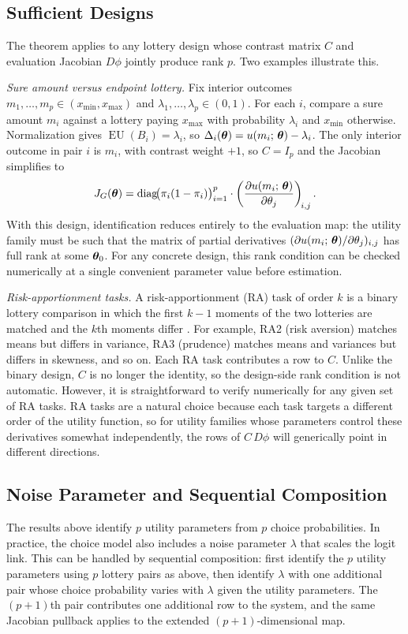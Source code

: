 \subsection{Sufficient Designs}

The theorem applies to any lottery design whose contrast matrix $C$
and evaluation Jacobian $D\phi$ jointly produce rank $p$. Two examples
illustrate this.

\textit{Sure amount versus endpoint lottery.} Fix interior outcomes
$m_1,\ldots,m_p \in (x_{\min},x_{\max})$ and
$\lambda_1,\ldots,\lambda_p \in (0,1)$. For each $i$, compare a sure
amount $m_i$ against a lottery paying $x_{\max}$ with probability
$\lambda_i$ and $x_{\min}$ otherwise. Normalization gives
$\operatorname{EU}(B_i) = \lambda_i$, so
$\Delta_i(\boldsymbol{\theta}) =
 u(m_i;\,\boldsymbol{\theta}) - \lambda_i$.
The only interior outcome in pair $i$ is $m_i$, with contrast weight
$+1$, so $C = I_p$ and the Jacobian simplifies to
\begin{equation}\label{eq:binary_jac_app}
  J_G(\boldsymbol{\theta})
  =
  \operatorname{diag}\!\bigl(\pi_i(1-\pi_i)\bigr)_{i=1}^p
  \cdot
  \left(
    \frac{\partial u(m_i;\,\boldsymbol{\theta})}{\partial \theta_j}
  \right)_{\!i,j}.
\end{equation}
With this design, identification reduces entirely to the evaluation
map: the utility family must be such that the matrix of partial
derivatives $(\partial u(m_i;\,\boldsymbol{\theta})/\partial
\theta_j)_{i,j}$ has full rank at some $\boldsymbol{\theta}_0$.
For any concrete design, this rank condition can be checked numerically at a
single convenient parameter value before estimation.

\textit{Risk-apportionment tasks.} A risk-apportionment (RA) task of
order $k$ is a binary lottery comparison in which the first $k-1$
moments of the two lotteries are matched and the $k$th moments differ
\parencite{Eeckhoudt2006}. For example, RA2 (risk aversion) matches
means but differs in variance, RA3 (prudence) matches means and
variances but differs in skewness, and so on. Each RA task contributes
a row to $C$. Unlike the binary design, $C$ is no longer the identity,
so the design-side rank condition is not automatic. However, it is
straightforward to verify numerically for any given set of RA tasks.
RA tasks are a natural choice because each task targets a different
order of the utility function, so for utility families whose parameters
control these derivatives somewhat independently, the rows of
$C\,D\phi$ will generically point in different directions.

\subsection{Noise Parameter and Sequential Composition}

The results above identify $p$ utility parameters from $p$ choice
probabilities. In practice, the choice model also includes a noise
parameter $\lambda$ that scales the logit link. This can be handled by
sequential composition: first identify the $p$ utility parameters using
$p$ lottery pairs as above, then identify $\lambda$ with one additional
pair whose choice probability varies with $\lambda$ given the utility
parameters. The $(p+1)$th pair contributes one additional row to the
system, and the same Jacobian pullback applies to the extended
$(p+1)$-dimensional map.
